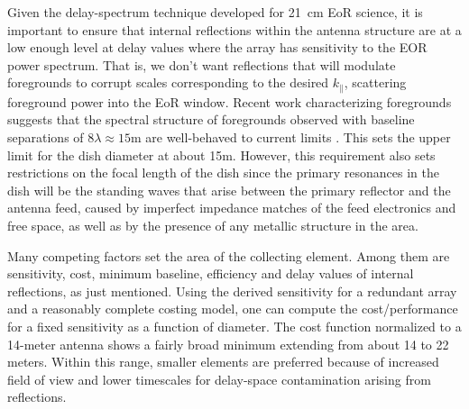\documentclass[preprint]{aastex}
\def\kpar{k_{\|}}
\def\kpar{k_{\|}}
\begin{document}
Given the delay-spectrum technique developed for 21~cm EoR science, it is important
to ensure that internal reflections within the antenna structure are at a low enough
level at delay values where the array has sensitivity to the EOR power spectrum. That
is, we don't want reflections that will modulate foregrounds to corrupt scales
corresponding to the desired $\kpar$, scattering foreground power into the EoR
window. Recent work characterizing foregrounds suggests that the spectral structure
of foregrounds observed with baseline separations of $8\lambda \approx 15$m are
well-behaved to current limits \citep{pober_et_al2013b,parsons_et_al2013}. This sets the upper limit
for the dish diameter at about 15m. However, this requirement also sets restrictions
on the focal length of the dish since the primary resonances in the dish will be the
standing waves that arise between the primary reflector and the antenna feed, caused
by imperfect impedance matches of the feed electronics and free space, as well as by
the presence of any metallic structure in the area.

Many competing factors set the area of the collecting element. Among them are
sensitivity, cost, minimum baseline, efficiency and delay values of internal
reflections, as just mentioned. Using the derived sensitivity for a redundant array
\citep{parsons_et_al2012a} and a reasonably complete costing model, one can compute
the cost/performance for a fixed sensitivity as a function of diameter. 
The cost function normalized to a 14-meter antenna shows a
fairly broad minimum extending from about 14 to 22 meters. 
Within this range,
smaller elements are preferred because of increased field of view and lower
timescales for delay-space contamination arising from reflections.

\end{document}

